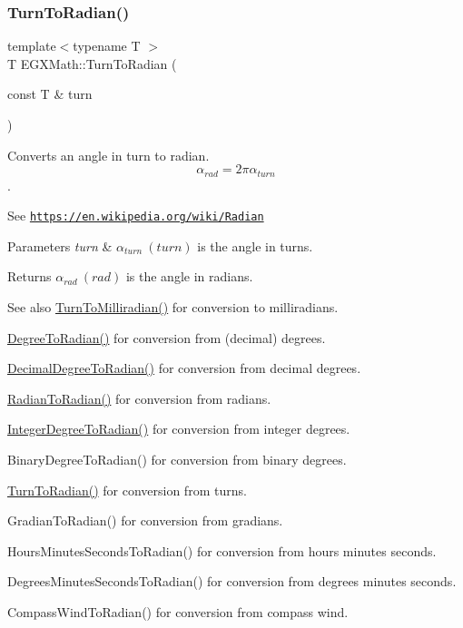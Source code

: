 \subsubsection{\texorpdfstring{Turn\+To\+Radian()}{TurnToRadian()}}
{\footnotesize\ttfamily template$<$typename T $>$ \\
T E\+G\+X\+Math\+::\+Turn\+To\+Radian (\begin{DoxyParamCaption}\item[{const T \&}]{turn }\end{DoxyParamCaption})}



Converts an angle in turn to radian. \[\alpha_{rad}=2\pi\alpha_{turn}\]. 

See \href{https://en.wikipedia.org/wiki/Radian}{\tt https\+://en.\+wikipedia.\+org/wiki/\+Radian} 
\begin{DoxyParams}{Parameters}
{\em turn} & $\alpha_{turn}\ (turn)$ is the angle in turns. \\
\hline
\end{DoxyParams}
\begin{DoxyReturn}{Returns}
$\alpha_{rad}\ (rad)$ is the angle in radians. 
\end{DoxyReturn}
\begin{DoxySeeAlso}{See also}
\mbox{\hyperlink{group___e_g_x_math-_angle_conversions-_turn_ga2aea2621472294ce4c25ac7e55db51c6}{Turn\+To\+Milliradian()}} for conversion to milliradians. 

\mbox{\hyperlink{group___e_g_x_math-_angle_conversions-_degree_ga48585541b228c852c9d08a9eac3682f0}{Degree\+To\+Radian()}} for conversion from (decimal) degrees. 

\mbox{\hyperlink{group___e_g_x_math-_angle_conversions-_decimal_degree_ga906ee2c83cdf4caa59eb613dc2d5d52a}{Decimal\+Degree\+To\+Radian()}} for conversion from decimal degrees. 

\mbox{\hyperlink{group___e_g_x_math-_angle_conversions-_radian_gae08681bd86b8e7e4325f6c8cb3a0dc37}{Radian\+To\+Radian()}} for conversion from radians. 

\mbox{\hyperlink{group___e_g_x_math-_angle_conversions-_integer_degree_ga05d3368b00ea27b9895de2ffe5c8df38}{Integer\+Degree\+To\+Radian()}} for conversion from integer degrees. 

Binary\+Degree\+To\+Radian() for conversion from binary degrees. 

\mbox{\hyperlink{group___e_g_x_math-_angle_conversions-_turn_ga72e6d3c46ebfc25f7be5050136d8df16}{Turn\+To\+Radian()}} for conversion from turns. 

Gradian\+To\+Radian() for conversion from gradians. 

Hours\+Minutes\+Seconds\+To\+Radian() for conversion from hours minutes seconds. 

Degrees\+Minutes\+Seconds\+To\+Radian() for conversion from degrees minutes seconds. 

Compass\+Wind\+To\+Radian() for conversion from compass wind. 
\end{DoxySeeAlso}
